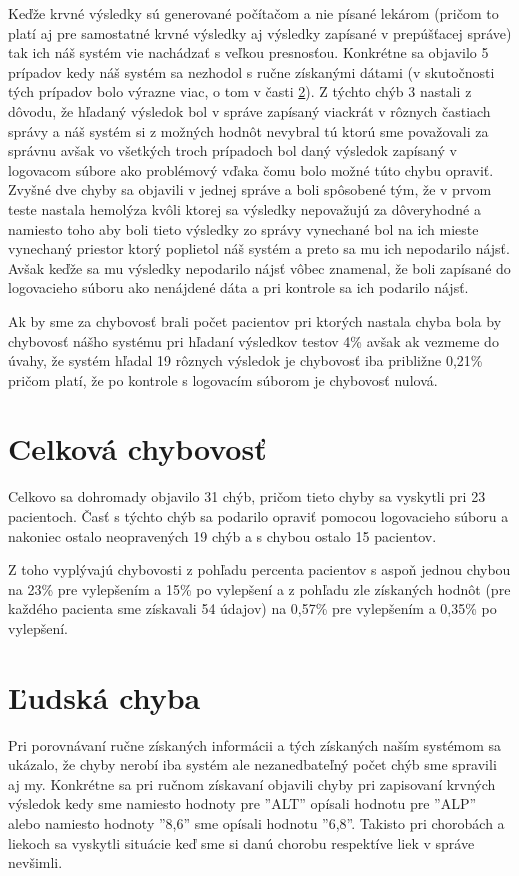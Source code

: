 Keďže krvné výsledky sú generované počítačom a nie písané lekárom (pričom to platí aj pre samostatné krvné výsledky aj výsledky zapísané v prepúšťacej správe) tak ich náš systém vie nachádzať s veľkou presnosťou. Konkrétne sa objavilo 5 prípadov kedy náš systém sa nezhodol s ručne získanými dátami (v skutočnosti tých prípadov bolo výrazne viac, o tom v časti \ref{ludChyba}). Z týchto chýb 3 nastali z dôvodu, že hľadaný výsledok bol v správe zapísaný viackrát v rôznych častiach správy a náš systém si z možných hodnôt nevybral tú ktorú sme považovali za správnu avšak vo všetkých troch prípadoch bol daný výsledok zapísaný v logovacom súbore ako problémový vďaka čomu bolo možné túto chybu opraviť. Zvyšné dve chyby sa objavili v jednej správe a boli spôsobené tým, že v prvom teste nastala hemolýza kvôli ktorej sa výsledky nepovažujú za dôveryhodné a namiesto toho aby boli tieto výsledky zo správy vynechané bol na ich mieste vynechaný priestor ktorý poplietol náš systém a preto sa mu ich nepodarilo nájsť. Avšak keďže sa mu výsledky nepodarilo nájsť vôbec znamenal, že boli zapísané do logovacieho súboru ako nenájdené dáta a pri kontrole sa ich podarilo nájsť.

Ak by sme za chybovosť brali počet pacientov pri ktorých nastala chyba bola by chybovosť nášho systému pri hľadaní výsledkov testov 4\% avšak ak vezmeme do úvahy, že systém hľadal 19 rôznych výsledok je chybovosť iba približne 0,21\% pričom platí, že po kontrole s logovacím súborom je chybovosť nulová.

\section{Celková chybovosť}

Celkovo sa dohromady objavilo 31 chýb, pričom tieto chyby sa vyskytli pri 23 pacientoch. Časť s týchto chýb sa podarilo opraviť pomocou logovacieho súboru a nakoniec ostalo neopravených 19 chýb a s chybou ostalo 15 pacientov.

Z toho vyplývajú chybovosti z pohľadu percenta pacientov s aspoň jednou chybou na 23\% pre vylepšením a 15\% po vylepšení a z pohľadu zle získaných hodnôt (pre každého pacienta sme získavali 54 údajov) na 0,57\% pre vylepšením a 0,35\% po vylepšení.

\section{Ľudská chyba}
\label{ludChyba}

Pri porovnávaní ručne získaných informácii a tých získaných naším systémom sa ukázalo, že chyby nerobí iba systém ale nezanedbateľný počet chýb sme spravili aj my. Konkrétne sa pri ručnom získavaní objavili chyby pri zapisovaní krvných výsledok kedy sme namiesto hodnoty pre ''ALT'' opísali hodnotu pre ''ALP'' alebo namiesto hodnoty ''8,6'' sme opísali hodnotu ''6,8''. Takisto pri chorobách a liekoch sa vyskytli situácie keď sme si danú chorobu respektíve liek v správe nevšimli. 

